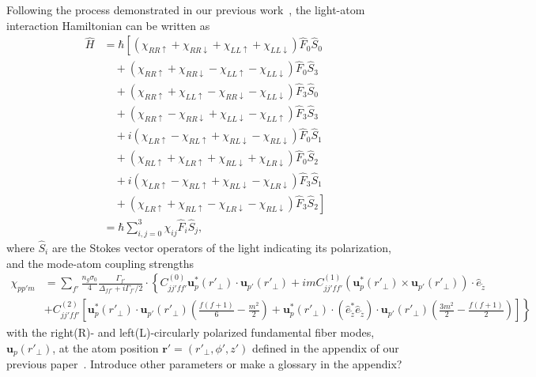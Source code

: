 \documentclass[pra,twocolumn,floatfix,superscriptaddress]{revtex4-1} %
\def\br{\mathbf{r}}
\def\bra#1{\langle{#1}\rvert}%
\def\ket#1{\lvert{#1}\rangle}%
\newcommand{\comment}[1]{{\color{Maroon} #1}}
\begin{document}
Following the process demonstrated in our previous work~\cite{Qi2016}, the light-atom interaction Hamiltonian can be written as
\begin{align}
\hat{H} &= \hbar \left[\left(\chi_{RR\uparrow} + \chi_{RR\downarrow} +\chi_{LL\uparrow}+\chi_{LL\downarrow} \right)\hat{F}_0\hat{S}_0 \right.\nonumber\\
&\quad+\left(\chi_{RR\uparrow} + \chi_{RR\downarrow} -\chi_{LL\uparrow}-\chi_{LL\downarrow} \right)\hat{F}_0\hat{S}_3\nonumber\\
&\quad+\left(\chi_{RR\uparrow} + \chi_{LL\uparrow} -\chi_{RR\downarrow}-\chi_{LL\downarrow} \right)\hat{F}_3\hat{S}_0\nonumber\\
&\quad+\left(\chi_{RR\uparrow} - \chi_{RR\downarrow} +\chi_{LL\downarrow}-\chi_{LL\uparrow} \right)\hat{F}_3\hat{S}_3\nonumber\\
&\quad+i\left(\chi_{LR\uparrow} - \chi_{RL\uparrow} +\chi_{RL\downarrow}-\chi_{RL\downarrow} \right)\hat{F}_0\hat{S}_1\nonumber\\
&\quad+\left(\chi_{RL\uparrow} + \chi_{LR\uparrow} +\chi_{RL\downarrow}+\chi_{LR\downarrow} \right)\hat{F}_0\hat{S}_2\nonumber\\
&\quad+i\left(\chi_{LR\uparrow} - \chi_{RL\uparrow} +\chi_{RL\downarrow}-\chi_{LR\downarrow} \right)\hat{F}_3\hat{S}_1\nonumber\\
&\quad+\left.\left(\chi_{LR\uparrow} + \chi_{RL\uparrow} -\chi_{LR\downarrow}-\chi_{RL\downarrow} \right)\hat{F}_3\hat{S}_2 \right]\\
&=\hbar\sum_{i,j=0}^3 \chi_{ij}\hat{F}_i\hat{S}_j,
\end{align}
where $ \hat{S}_i $ are the Stokes vector operators of the light indicating its polarization, and the mode-atom coupling strengths
\begin{align}
\chi_{pp'm} 
&= \sum_{f'} \frac{n_g\sigma_0}{4}\frac{\Gamma_{f'}}{\Delta_{ff'}+i\Gamma_{f'}/2}\cdot \left\{ C_{jj'ff'}^{(0)}\mathbf{u}_p^*(r'\!_\perp)\cdot \mathbf{u}_{p'}(r'\!_\perp)+imC_{jj'ff'}^{(1)}\left(\mathbf{u}_p^*(r'\!_\perp)\times\mathbf{u}_{p'}(r'\!_\perp) \right)\cdot \hat{e}_{\tilde{z}} \right. \nonumber\\
&\left.+C_{jj'ff'}^{(2)}\left[\mathbf{u}_p^*(r'\!_\perp)\cdot \mathbf{u}_{p'}(r'\!_\perp)\left(\frac{f(f+1)}{6}-\frac{m^2}{2} \right)+\mathbf{u}_p^*(r'\!_\perp)\cdot (\hat{e}^*_{\tilde{z}}\hat{e}_{\tilde{z}})\cdot \mathbf{u}_{p'}(r'\!_\perp)\left(\frac{3m^2}{2}-\frac{f(f+1)}{2} \right) \right] \right\}
\end{align}
with the right(R)- and left(L)-circularly polarized fundamental fiber modes, $ \mathbf{u}_p(r'\!_\perp) $, at the atom position $ \br'=(r'\!_\perp,\phi',z') $ defined in the appendix of our previous paper~\cite{Qi2016}. 
\comment{Introduce other parameters or make a glossary in the appendix?}
\end{document}
